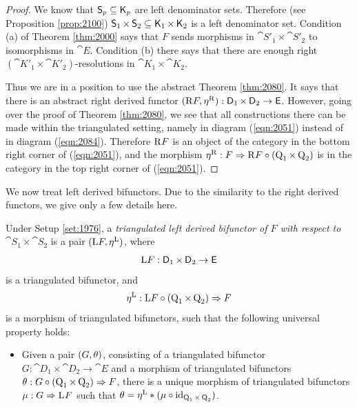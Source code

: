\begin{proof}
We know that $\operatorname{\mathsf{S}}_p \subseteq \operatorname{\mathsf{K}}_p$ are left denominator sets. Therefore 
(see Proposition \ref{prop:2100})
$\operatorname{\mathsf{S}}_1 \times \operatorname{\mathsf{S}}_2 \subseteq \operatorname{\mathsf{K}}_1 \times \operatorname{\mathsf{K}}_2$
is a  left denominator set.
Condition (a) of Theorem \ref{thm:2000} says that $F$ sends morphisms in 
$\cat{S}'_1 \times \cat{S}'_2$ to isomorphisms in $\cat{E}$. 
Condition (b) there says that there are enough right 
$(\cat{K}'_1 \times \cat{K}'_2)$-resolutions in 
$\cat{K}_1 \times \cat{K}_2$.

Thus we are in a position to use the abstract Theorem \ref{thm:2080}.
It says that there is an abstract right derived functor 
$(\mathrm{R} F, \eta^{\mathrm{R}}) :  \operatorname{\mathsf{D}}_1 \times \operatorname{\mathsf{D}}_2 \to \operatorname{\mathsf{E}}$.
However, going over the proof of Theorem \ref{thm:2080},
we see that all constructions there can be made within the triangulated 
setting, namely in diagram (\ref{eqn:2051}) instead of in  diagram 
(\ref{eqn:2084}). Therefore $\mathrm{R} F$ is an object of the category in the 
bottom right corner of (\ref{eqn:2051}), and the morphism 
$\eta^{\mathrm{R}} : F \Rightarrow \mathrm{R} F \circ (\operatorname{Q}_1 \times \operatorname{Q}_2)$
is in the category in the top right corner of (\ref{eqn:2051}).
\end{proof}

We now treat left derived bifunctors. Due to the similarity to the right 
derived functors, we give only a few details here. 

\begin{dfn} \label{dfn:2105}
Under Setup \ref{set:1976}, 
a {\em triangulated left derived bifunctor of $F$ with respect to 
$\cat{S}_1 \times \cat{S}_2$}%
is a pair $(\mathrm{L} F, \eta^{\mathrm{L}})$, where 
\[ \mathrm{L} F : \operatorname{\mathsf{D}}_1 \times \operatorname{\mathsf{D}}_2 \to \operatorname{\mathsf{E}} \]
is a triangulated bifunctor, and 
\[ \eta^{\mathrm{L}} :  \mathrm{L} F \circ (\operatorname{Q}_1 \times \operatorname{Q}_2) \Rightarrow F \] 
is a morphism of triangulated bifunctors, 
such that the following universal property holds:
\begin{itemize}
\item[(L)] Given a pair $(G, \theta)$, consisting of a triangulated 
bifunctor
$G : \cat{D}_1 \times \cat{D}_2 \to \cat{E}$ 
and a morphism of triangulated bifunctors 
$\theta :  G \circ (\operatorname{Q}_1 \times \operatorname{Q}_2) \Rightarrow F$,
there is a unique morphism of triangulated bifunctors 
$\mu : G \Rightarrow \mathrm{L}^{} F$
such that 
$\theta =  \eta^{\mathrm{L}} * (\mu \circ \operatorname{id}_{\operatorname{Q}_1 \times \operatorname{Q}_2})$.
\end{itemize}
\end{dfn}

